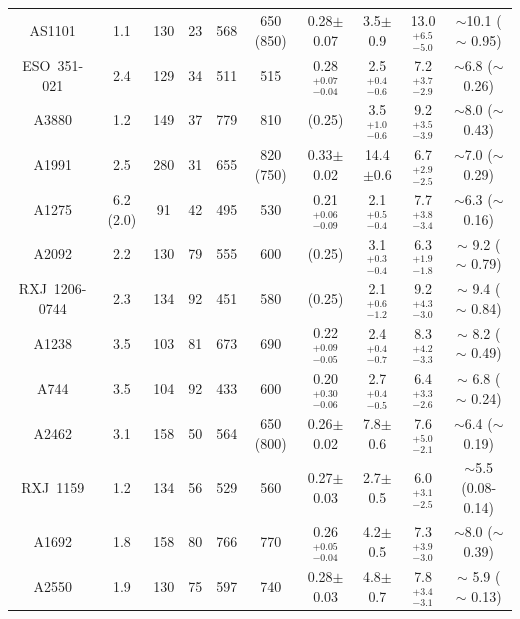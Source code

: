 \documentclass{aastex}
\begin{document}
\begin{table}
\begin{center}
{\begin{tabular}{cccccccccc}
AS1101 & 1.1 & 130 & 23 & 568 & 650 (850) & 0.28$\pm$0.07 & 3.5$\pm$0.9 & 13.0$^{+6.5}_{-5.0}$ & $\sim$10.1 ($\sim$ 0.95) \\
ESO~351-021 & 2.4 & 129 & 34 & 511 & 515 & 0.28$^{+0.07}_{-0.04}$ & 2.5$^{+0.4}_{-0.6}$ & 7.2$^{+3.7}_{-2.9}$ & $\sim$6.8 ($\sim$ 0.26)\\
A3880 & 1.2 & 149 & 37 & 779 & 810 & (0.25) & 3.5$^{+1.0}_{-0.6}$ & 9.2$^{+3.5}_{-3.9}$ & $\sim$8.0 ($\sim$ 0.43)\\
A1991 & 2.5 & 280 & 31 & 655 & 820 (750) & 0.33$\pm$0.02 & 14.4$\pm$0.6 & 6.7$^{+2.9}_{-2.5}$ & $\sim$7.0 ($\sim$ 0.29)\\
A1275 & 6.2 (2.0) & 91 & 42 & 495 & 530 & 0.21$^{+0.06}_{-0.09}$ & 2.1$^{+0.5}_{-0.4}$ & 7.7$^{+3.8}_{-3.4}$ & $\sim$6.3 ($\sim$ 0.16) \\
A2092 & 2.2 & 130 & 79 & 555 & 600 & (0.25) & 3.1$^{+0.3}_{-0.4}$ & 6.3$^{+1.9}_{-1.8}$ & $\sim$ 9.2 ($\sim$ 0.79) \\
RXJ~1206-0744 & 2.3 & 134 & 92 & 451 & 580 & (0.25) & 2.1$^{+0.6}_{-1.2}$ & 9.2$^{+4.3}_{-3.0}$ & $\sim$ 9.4 ($\sim$ 0.84) \\
A1238 & 3.5 & 103 & 81 & 673 & 690 & 0.22$^{+0.09}_{-0.05}$ & 2.4$^{+0.4}_{-0.7}$ & 8.3$^{+4.2}_{-3.3}$ & $\sim$ 8.2 ($\sim$ 0.49) \\
A744 & 3.5 & 104 & 92 & 433 & 600 & 0.20$^{+0.30}_{-0.06}$ & 2.7$^{+0.4}_{-0.5}$ & 6.4$^{+3.3}_{-2.6}$ & $\sim$ 6.8 ($\sim$ 0.24) \\
A2462 & 3.1 & 158 & 50 & 564 & 650 (800) & 0.26$\pm$0.02 & 7.8$\pm$0.6 & 7.6$^{+5.0}_{-2.1}$ & $\sim$6.4 ($\sim$ 0.19) \\
RXJ~1159 & 1.2 & 134 & 56 & 529 & 560 & 0.27$\pm$0.03 & 2.7$\pm$0.5 & 6.0$^{+3.1}_{-2.5}$ & $\sim$5.5 (0.08-0.14) \\
A1692 & 1.8 & 158 & 80 & 766 & 770 & 0.26$^{+0.05}_{-0.04}$ & 4.2$\pm$0.5 & 7.3$^{+3.9}_{-3.0}$ & $\sim$8.0 ($\sim$ 0.39)\\
A2550 & 1.9 & 130 & 75 & 597 & 740 & 0.28$\pm$0.03 & 4.8$\pm$0.7 & 7.8$^{+3.4}_{-3.1}$ & $\sim$ 5.9 ($\sim$ 0.13) \\


\end{tabular}}
\end{center}
\end{table}
\end{document}
